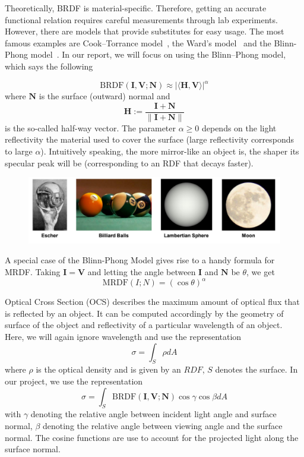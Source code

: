 \documentclass[11pt]{amsart}
\newcommand{\BRDF}{\mathrm{BRDF}}
\newcommand{\MRDF}{\mathrm{MRDF}}
\newcommand{\ip}[2]{\langle {#1}, {#2} \rangle}
\theoremstyle{definition}
\begin{document}
Theoretically, BRDF is material-specific. Therefore, getting an accurate functional
relation requires careful measurements through lab experiments. However, there
are models that provide substitutes for easy usage. The most famous examples
are Cook--Torrance model~\cite{CookTorr}, the Ward's model~\cite{Ward} and the
Blinn-Phong model~\cite{BlinnPhong}. In our report, we will focus on using the
Blinn--Phong model, which says the following

\[
   \BRDF(\mathbf{I},\mathbf{V};\mathbf{N})
   \approx
   |\ip{\mathbf{H}}{\mathbf{V}}|^\alpha
\]
where $\mathbf{N}$ is the surface (outward) normal and $$\mathbf{H}:=\frac{\mathbf{I}+\mathbf{N}} {\|\mathbf{I}+\mathbf{N}\|}$$
is the so-called half-way vector. The parameter $\alpha \geq 0$ depends on the light reflectivity the material used to cover the surface (large reflectivity corresponds to large $\alpha$). Intuitively speaking, the more mirror-like an object is,  the shaper its specular peak will be (corresponding to an RDF that decays faster). \begin{figure}[H]
 \includegraphics[width=1.1\textwidth]{./figs/surfaces.pdf}
\end{figure}


A special case of the Blinn-Phong Model gives rise to a handy formula for MRDF. Taking $\mathbf{I}=\mathbf{V}$ and letting the angle between $\mathbf{I}$ and $\mathbf{N}$ be $\theta$, we get
\[
\MRDF(I;N)=(\cos \theta)^\alpha
\]

Optical Cross Section (OCS) describes the maximum amount of optical flux that is reflected by an object. It can be computed accordingly by the geometry of surface of the object and reflectivity of a particular wavelength of an object. Here, we will again ignore wavelength and use the representation 
$$\sigma=\int_{S} \rho dA$$
where $\rho$ is the optical density and is given by an $RDF$, $S$ denotes the surface. In our project, we use the representation
$$\sigma= \int_S\BRDF(\mathbf{I},\mathbf{V};\mathbf{N}) \cos\gamma\cos\beta dA$$
with $\gamma$ denoting the relative angle between incident light angle and surface normal, $\beta$ denoting the relative angle between viewing angle and the surface normal. The cosine functions are use to account for the projected light along the surface normal. 
\end{document}
